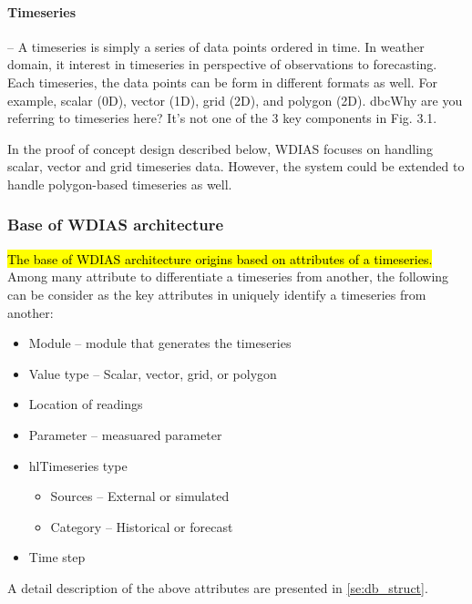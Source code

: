 \paragraph{Timeseries}-- A timeseries is simply a series of data points ordered in time. In weather domain, it interest in timeseries in perspective of observations to forecasting. Each timeseries, the data points can be form in different formats as well. For example, scalar (0D), vector (1D), grid (2D), and polygon (2D).
dbc{Why are you referring to timeseries here? It's not one of the 3 key components in Fig. 3.1.}

In the proof of concept design described below, WDIAS focuses on handling scalar, vector and grid timeseries data. However, the system could be extended to handle polygon-based timeseries as well.

\subsubsection{Base of WDIAS architecture}
\hl{The base of WDIAS architecture origins based on attributes of a timeseries.} %
Among many attribute to differentiate a timeseries from another, the following can be consider as the key attributes in uniquely identify a timeseries from another: %

\begin{itemize}
    \item Module -- module that generates the timeseries
    \item Value type -- Scalar, vector, grid, or polygon
    \item Location of readings
    \item Parameter -- measuared parameter
    \item hl{Timeseries type}
    \begin{itemize}
        \item Sources -- External or simulated
        \item Category -- Historical or forecast
    \end{itemize}
    \item Time step
\end{itemize}

A detail description of the above attributes are presented in \cref{se:db_struct}.